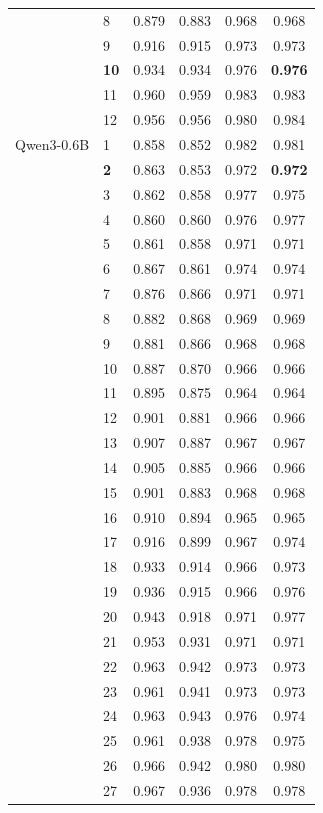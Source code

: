 \begin{longtable}{llcccc}
 & 8 & 0.879 & 0.883 & 0.968 & 0.968 \\
 & 9 & 0.916 & 0.915 & 0.973 & 0.973 \\
 & \textbf{10} & 0.934 & 0.934 & 0.976 & \textbf{0.976} \\
 & 11 & 0.960 & 0.959 & 0.983 & 0.983 \\
 & 12 & 0.956 & 0.956 & 0.980 & 0.984 \\
\midrule
Qwen3-0.6B & 1 & 0.858 & 0.852 & 0.982 & 0.981 \\
 & \textbf{2} & 0.863 & 0.853 & 0.972 & \textbf{0.972} \\
 & 3 & 0.862 & 0.858 & 0.977 & 0.975 \\
 & 4 & 0.860 & 0.860 & 0.976 & 0.977 \\
 & 5 & 0.861 & 0.858 & 0.971 & 0.971 \\
 & 6 & 0.867 & 0.861 & 0.974 & 0.974 \\
 & 7 & 0.876 & 0.866 & 0.971 & 0.971 \\
 & 8 & 0.882 & 0.868 & 0.969 & 0.969 \\
 & 9 & 0.881 & 0.866 & 0.968 & 0.968 \\
 & 10 & 0.887 & 0.870 & 0.966 & 0.966 \\
 & 11 & 0.895 & 0.875 & 0.964 & 0.964 \\
 & 12 & 0.901 & 0.881 & 0.966 & 0.966 \\
 & 13 & 0.907 & 0.887 & 0.967 & 0.967 \\
 & 14 & 0.905 & 0.885 & 0.966 & 0.966 \\
 & 15 & 0.901 & 0.883 & 0.968 & 0.968 \\
 & 16 & 0.910 & 0.894 & 0.965 & 0.965 \\
 & 17 & 0.916 & 0.899 & 0.967 & 0.974 \\
 & 18 & 0.933 & 0.914 & 0.966 & 0.973 \\
 & 19 & 0.936 & 0.915 & 0.966 & 0.976 \\
 & 20 & 0.943 & 0.918 & 0.971 & 0.977 \\
 & 21 & 0.953 & 0.931 & 0.971 & 0.971 \\
 & 22 & 0.963 & 0.942 & 0.973 & 0.973 \\
 & 23 & 0.961 & 0.941 & 0.973 & 0.973 \\
 & 24 & 0.963 & 0.943 & 0.976 & 0.974 \\
 & 25 & 0.961 & 0.938 & 0.978 & 0.975 \\
 & 26 & 0.966 & 0.942 & 0.980 & 0.980 \\
 & 27 & 0.967 & 0.936 & 0.978 & 0.978 \\

\end{longtable}
